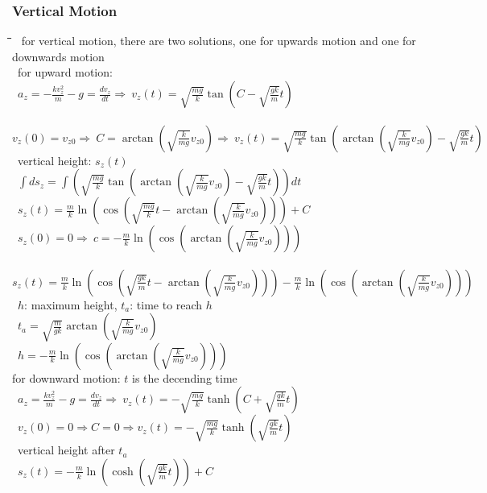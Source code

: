 \documentclass[10pt,letterpaper]{scrartcl}
\newcommand{\tbul}{\textbullet}
\newcommand{\tend}{\>\textendash}
\newcommand{\tabDef}{\hspace{2em}\=\hspace{2em}\=\hspace{2em}\=\hspace{2em}\=\kill}
\begin{document}
\subsubsection*{Vertical Motion}\begin{tabbing}\tabDef
\tbul\ for vertical motion, there are two solutions, one for upwards motion and one for downwards motion \\
\tbul\ for upward motion: \\
    \>\>\ $\displaystyle a_z = -\frac{kv^2_z}{m} - g = \frac{dv_z}{dt}\Rightarrow\ v_z(t) = \sqrt{\frac{mg}{k}}\tan(C - \sqrt{\frac{gk}{m}}t)$ \\
    \>\>\ $\displaystyle v_z(0) = v_{z0}\Rightarrow\ C = \arctan(\sqrt{\frac{k}{mg}}v_{z0})\Rightarrow\ v_z(t) = \sqrt{\frac{mg}{k}}\tan(\arctan(\sqrt{\frac{k}{mg}}v_{z0})-\sqrt{\frac{gk}{m}}t)$\\
    \tend\ vertical height: $s_z(t)$ \\
    \>\>\ $\displaystyle \int ds_z = \int (\sqrt{\frac{mg}{k}}\tan(\arctan(\sqrt{\frac{k}{mg}}v_{z0})-\sqrt{\frac{gk}{m}}t))dt$\\
    \>\>\ $\displaystyle s_z(t) = \frac{m}{k}\ln(\cos(\sqrt{\frac{mg}{k}}t-\arctan(\sqrt{\frac{k}{mg}}v_{z0})))+C$ \\
    \>\>\ $\displaystyle s_z(0) = 0\Rightarrow\ c = - \frac{m}{k}\ln(\cos(\arctan(\sqrt{\frac{k}{mg}}v_{z0})))$ \\
    \>\>\ $\displaystyle s_z(t) = \frac{m}{k}\ln(\cos(\sqrt{\frac{gk}{m}}t-\arctan(\sqrt{\frac{k}{mg}}v_{z0})))-\frac{m}{k}\ln(\cos(\arctan(\sqrt{\frac{k}{mg}}v_{z0})))$ \\
    \tend\ $h$: maximum height, $t_a$: time to reach $h$ \\
    \>\>\ $\displaystyle t_a = \sqrt{\frac{m}{gk}}\arctan(\sqrt{\frac{k}{mg}}v_{z0})$ \\
    \>\>\ $\displaystyle h = -\frac{m}{k}\ln(\cos(\arctan(\sqrt{\frac{k}{mg}}v_{z0})))$ \\
\tbul for downward motion: $t$ is the decending time \\
    \>\>\ $\displaystyle a_z = \frac{kv^2_z}{m}-g = \frac{dv_z}{dt}\Rightarrow\ v_z(t) = -\sqrt{\frac{mg}{k}}\tanh(C+\sqrt{\frac{gk}{m}}t)$ \\
    \>\>\ $\displaystyle v_z(0) = 0\Rightarrow C = 0\Rightarrow v_z(t)=-\sqrt{\frac{mg}{k}}\tanh(\sqrt{\frac{gk}{m}}t)$ \\
    \tend\ vertical height after $t_a$ \\
    \>\>\ $\displaystyle s_z(t) = -\frac{m}{k}\ln(\cosh(\sqrt{\frac{gk}{m}}t))+ C$ \\

\end{tabbing}
\end{document}
